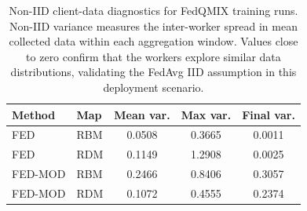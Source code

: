 \begin{table}[t]
\centering
\caption{Non-IID client-data diagnostics for FedQMIX training runs.
Non-IID variance measures the inter-worker spread in mean collected data
within each aggregation window. Values close to zero confirm that the
workers explore similar data distributions, validating the FedAvg
IID assumption in this deployment scenario.}
\label{tab:noniid}
\small
\begin{tabular}{llccc}
\toprule
Method & Map & Mean var. & Max var. & Final var. \\
\midrule
FED & RBM & 0.0508 & 0.3665 & 0.0011 \\
FED & RDM & 0.1149 & 1.2908 & 0.0025 \\
FED-MOD & RBM & 0.2466 & 0.8406 & 0.3057 \\
FED-MOD & RDM & 0.1072 & 0.4555 & 0.2374 \\
\bottomrule
\end{tabular}
\end{table}
